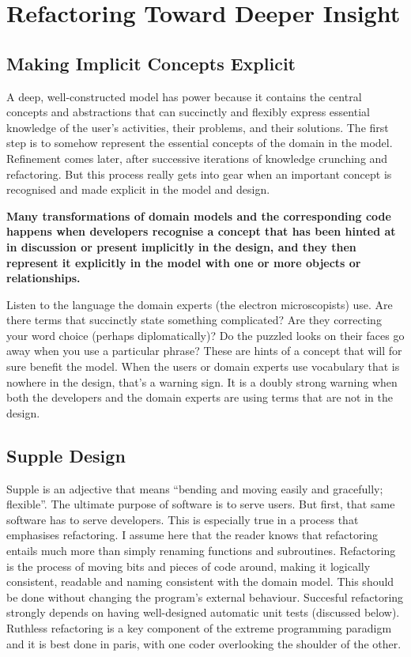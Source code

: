 \documentclass[a4paper,11pt]{article}
\begin{document}
\section{Refactoring Toward Deeper Insight}

\subsection{Making Implicit Concepts Explicit}
A deep, well-constructed model has power because it contains the central concepts and abstractions that can succinctly and flexibly express essential knowledge of the user's activities, their problems, and their solutions. The first step is to somehow represent the essential concepts of the domain in the model. Refinement comes later, after successive iterations of knowledge crunching and refactoring. But this process really gets into gear when an important concept is recognised and made explicit in the model and design.

\textbf{Many transformations of domain models and the corresponding code happens when developers recognise a concept that has been hinted at in discussion or present implicitly in the design, and they then represent it explicitly in the model with one or more objects or relationships.}

Listen to the language the domain experts (the electron microscopists) use. Are there terms that succinctly state something complicated? Are they correcting your word choice (perhaps diplomatically)? Do the puzzled looks on their faces go away when you use a particular phrase? These are hints of a concept that will for sure benefit the model. When the users or domain experts use vocabulary that is nowhere in the design, that's a warning sign. It is a doubly strong warning when both the developers and the domain experts are using terms that are not in the design.

\subsection{Supple Design}
Supple is an adjective that means ``bending and moving easily and gracefully; flexible''. The ultimate purpose of software is to serve users. But first, that same software has to serve developers. This is especially true in a process that emphasises refactoring. I assume here that the reader knows that refactoring entails much more than simply renaming functions and subroutines. Refactoring is the process of moving bits and pieces of code around, making it logically consistent, readable and naming consistent with the domain model. This should be done without changing the program's external behaviour. Succesful refactoring strongly depends on having well-designed automatic unit tests (discussed below). Ruthless refactoring is a key component of the extreme programming paradigm and it is best done in paris, with one coder overlooking the shoulder of the other.
\end{document}

